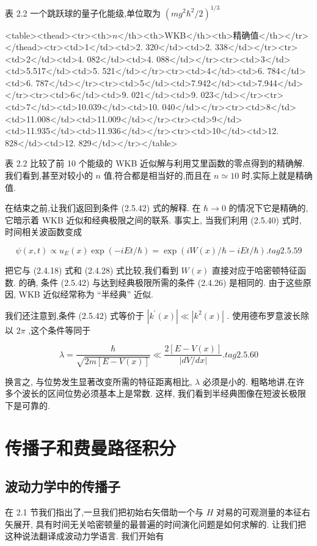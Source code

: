 \documentclass[lang=cn,newtx,10pt,scheme=chinese,thmcnt=section]{elegantbook}
\begin{document}
表 2.2 一个跳跃球的量子化能级,单位取为 ${\left( m{g}^{2}{\hbar }^{2}/2\right) }^{1/3}$

<table><thead><tr><th>$n$</th><th>WKB</th><th>精确值</th></tr></thead><tr><td>1</td><td>2. 320</td><td>2. 338</td></tr><tr><td>2</td><td>4. 082</td><td>4. 088</td></tr><tr><td>3</td><td>5.517</td><td>5. 521</td></tr><tr><td>4</td><td>6. 784</td><td>6. 787</td></tr><tr><td>5</td><td>7.942</td><td>7.944</td></tr><tr><td>6</td><td>9. 021</td><td>9. 023</td></tr><tr><td>7</td><td>10.039</td><td>10. 040</td></tr><tr><td>8</td><td>11.008</td><td>11.009</td></tr><tr><td>9</td><td>11.935</td><td>11.936</td></tr><tr><td>10</td><td>12. 828</td><td>12. 829</td></tr></table>

表 2.2 比较了前 10 个能级的 WKB 近似解与利用艾里函数的零点得到的精确解. 我们看到,甚至对较小的 $n$ 值,符合都是相当好的,而且在 $n \simeq {10}$ 时,实际上就是精确值.

在结束之前,让我们返回到条件 (2.5.42) 式的解释. 在 $\hbar \rightarrow 0$ 的情况下它是精确的, 它暗示着 WKB 近似和经典极限之间的联系. 事实上, 当我们利用 (2.5.40) 式时, 时间相关波函数变成

$$
\psi \left( {x, t}\right) \propto {u}_{E}\left( x\right) \exp \left( {-{iEt}/\hbar }\right) = \exp \left( {{iW}\left( x\right) /\hbar - {iEt}/\hbar }\right) . tag{2.5.59}
$$

把它与 (2.4.18) 式和 (2.4.28) 式比较,我们看到 $W\left( x\right)$ 直接对应于哈密顿特征函数. 的确, 条件 (2.5.42) 与达到经典极限所需的条件 (2.4.26) 是相同的. 由于这些原因, WKB 近似经常称为 “半经典” 近似.

我们还注意到,条件 (2.5.42) 式等价于 $\left| {{k}^{\prime }\left( x\right) }\right| \ll \left| {{k}^{2}\left( x\right) }\right|$ . 使用德布罗意波长除以 ${2\pi }$ ,这个条件等同于

$$
\lambda = \frac{\hbar }{\sqrt{{2m}\left\lbrack {E - V\left( x\right) }\right\rbrack }} \ll \frac{2\left\lbrack {E - V\left( x\right) }\right\rbrack }{\left| dV/dx\right| }. tag{2.5.60}
$$

换言之, 与位势发生显著改变所需的特征距离相比, $\lambda$ 必须是小的. 粗略地讲,在许多个波长的区间位势必须基本上是常数. 这样, 我们看到半经典图像在短波长极限下是可靠的.
\section{传播子和费曼路径积分}
\subsection*{波动力学中的传播子}
在 2.1 节我们指出了,一旦我们把初始右矢借助一个与 $H$ 对易的可观测量的本征右矢展开, 具有时间无关哈密顿量的最普遍的时间演化问题是如何求解的. 让我们把这种说法翻译成波动力学语言. 我们开始有
\end{document}

